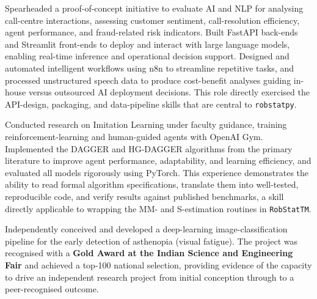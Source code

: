 \documentclass[11pt, a4paper]{article}
\begin{document}
\begin{description}[leftmargin=0pt, itemsep=8pt]

  \item[\normalfont\textbf{IT Risk Management and Analyst Intern,
        Virginia Department of Motor Vehicles}
        ]
  Spearheaded a proof-of-concept initiative to evaluate AI and NLP for
  analysing call-centre interactions, assessing customer sentiment,
  call-resolution efficiency, agent performance, and fraud-related risk
  indicators.
  Built FastAPI back-ends and Streamlit front-ends to deploy and interact
  with large language models, enabling real-time inference and operational
  decision support.
  Designed and automated intelligent workflows using n8n to streamline
  repetitive tasks, and processed unstructured speech data to produce
  cost-benefit analyses guiding in-house versus outsourced AI deployment
  decisions.
  This role directly exercised the API-design, packaging, and data-pipeline
  skills that are central to \texttt{robstatpy}.

  \item[\normalfont\textbf{Undergraduate Research Volunteer,
        University of Michigan -- Imitation Learning}
        ]
  Conducted research on Imitation Learning under faculty guidance, training
  reinforcement-learning and human-guided agents with OpenAI Gym.
  Implemented the DAGGER and HG-DAGGER algorithms from the primary literature
  to improve agent performance, adaptability, and learning efficiency, and
  evaluated all models rigorously using PyTorch.
  This experience demonstrates the ability to read formal algorithm
  specifications, translate them into well-tested, reproducible code,
  and verify results against published benchmarks, a skill directly
  applicable to wrapping the MM- and S-estimation routines in
  \texttt{RobStatTM}.

  \item[\normalfont\textbf{Deep Learning Algorithm for Asthenopia Detection}
        ]
  Independently conceived and developed a deep-learning image-classification
  pipeline for the early detection of asthenopia (visual fatigue).
  The project was recognised with a \textbf{Gold Award at the Indian Science
  and Engineering Fair} and achieved a top-100 national selection, providing
  evidence of the capacity to drive an independent research project from
  initial conception through to a peer-recognised outcome.

\end{description}
\end{document}
